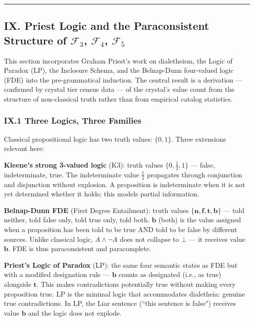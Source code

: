 \documentclass[12pt,a4paper]{article}
\begin{document}
\begin{center}
\rule{0.5\textwidth}{0.4pt}
\end{center}

\subsection{IX. Priest Logic and the Paraconsistent Structure of $\mathcal{F}_3$, $\mathcal{F}_4$, $\mathcal{F}_5$}
This section incorporates Graham Priest's work on dialetheism, the Logic of Paradox (LP), the Inclosure Schema, and the Belnap-Dunn four-valued logic (FDE) into the pre-grammatical induction. The central result is a derivation --- confirmed by crystal tier census data --- of the crystal's value count from the structure of non-classical truth rather than from empirical catalog statistics.

\subsubsection{IX.1 Three Logics, Three Families}
Classical propositional logic has two truth values: $\{0, 1\}$. Three extensions relevant here:

\textbf{Kleene's strong 3-valued logic} (K3): truth values $\{0, \frac{1}{2}, 1\}$ --- false, indeterminate, true. The indeterminate value $\frac{1}{2}$ propagates through conjunction and disjunction without explosion. A proposition is indeterminate when it is not yet determined whether it holds; this models partial information.

\textbf{Belnap-Dunn FDE} (First Degree Entailment): truth values $\{\mathbf{n}, \mathbf{f}, \mathbf{t}, \mathbf{b}\}$ --- told neither, told false only, told true only, told both. $\mathbf{b}$ (both) is the value assigned when a proposition has been told to be true AND told to be false by different sources. Unlike classical logic, $A \wedge \neg A$ does not collapse to $\bot$ --- it receives value $\mathbf{b}$. FDE is thus paraconsistent and paracomplete.

\textbf{Priest's Logic of Paradox} (LP): the same four semantic states as FDE but with a modified designation rule --- $\mathbf{b}$ counts as designated (i.e., as true) alongside $\mathbf{t}$. This makes contradictions potentially true without making every proposition true. LP is the minimal logic that accommodates dialetheia: genuine true contradictions. In LP, the Liar sentence (``this sentence is false") receives value $\mathbf{b}$ and the logic does not explode.
\end{document}
